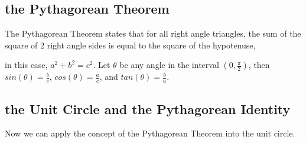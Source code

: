 \documentclass[12pt, titlepage]{article}
\begin{document}
    \subsection{the Pythagorean Theorem}
    \label{sec:pytha}
    The Pythagorean Theorem states that for all right angle triangles, the sum of the square of 2 right angle sides is equal to the square of the hypotenuse,
    \begin{center}
    \end{center}
    in this case, $a^2+b^2=c^2$. Let $\theta$ be any angle in the interval $(0,\frac{\pi}{2})$, then $sin(\theta)=\frac{b}{c}$, $cos(\theta)=\frac{a}{c}$, and $tan(\theta)=\frac{b}{a}$.

    \subsection{the Unit Circle and the Pythagorean Identity}
    \label{sec:4.2}
    Now we can apply the concept of the Pythagorean Theorem into the unit circle.
\end{document}
